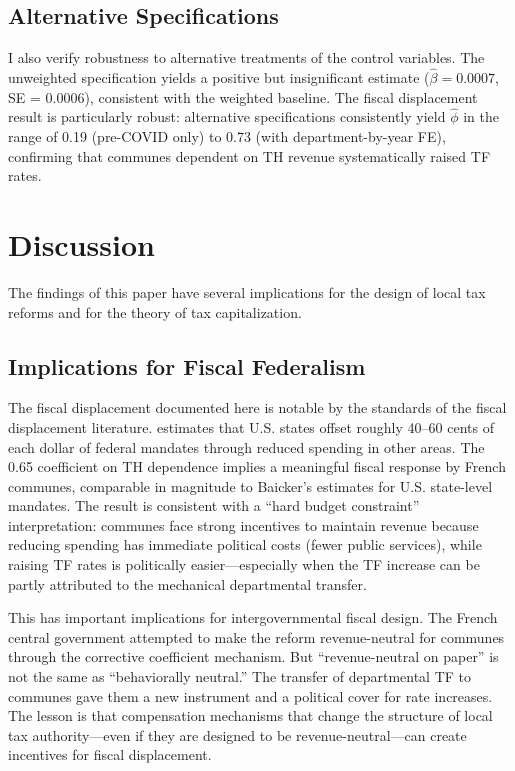 \documentclass[12pt]{article}
\begin{document}
\subsection{Alternative Specifications}

I also verify robustness to alternative treatments of the control variables. The unweighted specification yields a positive but insignificant estimate ($\hat\beta = 0.0007$, SE = 0.0006), consistent with the weighted baseline. The fiscal displacement result is particularly robust: alternative specifications consistently yield $\hat\phi$ in the range of 0.19 (pre-COVID only) to 0.73 (with department-by-year FE), confirming that communes dependent on TH revenue systematically raised TF rates.


\section{Discussion}

The findings of this paper have several implications for the design of local tax reforms and for the theory of tax capitalization.

\subsection{Implications for Fiscal Federalism}

The fiscal displacement documented here is notable by the standards of the fiscal displacement literature. \citet{baicker2004fiscal} estimates that U.S. states offset roughly 40--60 cents of each dollar of federal mandates through reduced spending in other areas. The 0.65 coefficient on TH dependence implies a meaningful fiscal response by French communes, comparable in magnitude to Baicker's estimates for U.S. state-level mandates. The result is consistent with a ``hard budget constraint'' interpretation: communes face strong incentives to maintain revenue because reducing spending has immediate political costs (fewer public services), while raising TF rates is politically easier---especially when the TF increase can be partly attributed to the mechanical departmental transfer.

This has important implications for intergovernmental fiscal design. The French central government attempted to make the reform revenue-neutral for communes through the corrective coefficient mechanism. But ``revenue-neutral on paper'' is not the same as ``behaviorally neutral.'' The transfer of departmental TF to communes gave them a new instrument and a political cover for rate increases. The lesson is that compensation mechanisms that change the structure of local tax authority---even if they are designed to be revenue-neutral---can create incentives for fiscal displacement.
\end{document}
